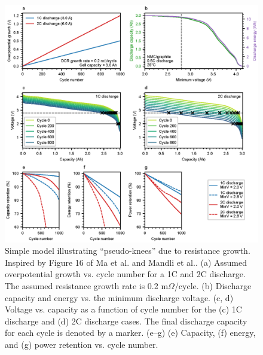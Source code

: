 \documentclass[journal=jpcl, manuscript=article, layout=onecolumn]{achemso}
\begin{document}
\begin{figure}[ht]
\centering
\includegraphics[scale = 1]{figures/dcr_growth_knee_2.eps}
\caption{Simple model illustrating ``pseudo-knees'' due to resistance growth. Inspired by Figure 16 of Ma et al.\cite{ma_editors_2019} and Mandli et al.\cite{mandli_analysis_2019}. (a) Assumed overpotential growth vs. cycle number for a 1C and 2C discharge. The assumed resistance growth rate is 0.2 m$\Omega$/cycle. (b) Discharge capacity and energy vs. the minimum discharge voltage. (c, d) Voltage vs. capacity as a function of cycle number for the (c) 1C discharge and (d) 2C discharge cases. The final discharge capacity for each cycle is denoted by a marker. (e--g) (e) Capacity, (f) energy, and (g) power retention vs. cycle number.
}
\label{fig:dcr_knee}
\end{figure}
\end{document}
